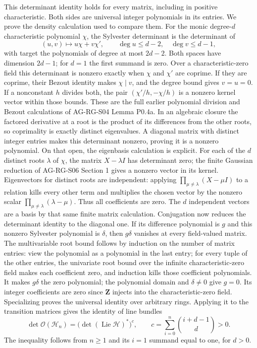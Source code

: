 \documentclass[11pt,a4paper,openany]{report}
\begin{document}
This determinant identity holds for every matrix, including in positive characteristic. Both sides are universal integer polynomials in its entries. We prove the density calculation used to compare them. For the monic degree-\(d\) characteristic polynomial \(\chi\), the Sylvester determinant is the determinant of \[
 (u,v)\longmapsto u\chi+v\chi',
 \qquad \deg u\leq d-2,\quad\deg v\leq d-1,
\] with target the polynomials of degree at most \(2d-2\). Both spaces have dimension \(2d-1\); for \(d=1\) the first summand is zero. Over a characteristic-zero field this determinant is nonzero exactly when \(\chi\) and \(\chi'\) are coprime. If they are coprime, their Bezout identity makes \(\chi\mid v\), and the degree bound gives \(v=u=0\). If a nonconstant \(h\) divides both, the pair \((\chi'/h,-\chi/h)\) is a nonzero kernel vector within those bounds. These are the full earlier polynomial division and Bezout calculations of AG-RG-S04 Lemma P0.4a. In an algebraic closure the factored derivative at a root is the product of its differences from the other roots, so coprimality is exactly distinct eigenvalues. A diagonal matrix with distinct integer entries makes this determinant nonzero, proving it is a nonzero polynomial. On that open, the eigenbasis calculation is explicit. For each of the \(d\) distinct roots \(\lambda\) of \(\chi\), the matrix \(X-\lambda I\) has determinant zero; the finite Gaussian reduction of AG-RG-S06 Section 1 gives a nonzero vector in its kernel. Eigenvectors for distinct roots are independent: applying \(\prod_{\mu\ne\lambda}(X-\mu I)\) to a relation kills every other term and multiplies the chosen vector by the nonzero scalar \(\prod_{\mu\ne\lambda}(\lambda-\mu)\). Thus all coefficients are zero. The \(d\) independent vectors are a basis by that same finite matrix calculation. Conjugation now reduces the determinant identity to the diagonal one. If its difference polynomial is \(g\) and this nonzero Sylvester polynomial is \(\delta\), then \(g\delta\) vanishes at every field-valued matrix. The multivariable root bound follows by induction on the number of matrix entries: view the polynomial as a polynomial in the last entry; for every tuple of the other entries, the univariate root bound over the infinite characteristic-zero field makes each coefficient zero, and induction kills those coefficient polynomials. It makes \(g\delta\) the zero polynomial; the polynomial domain and \(\delta\ne0\) give \(g=0\). Its integer coefficients are zero since \(\mathbf Z\) injects into the characteristic-zero field. Specializing proves the universal identity over arbitrary rings. Applying it to the transition matrices gives the identity of line bundles \[
 \det\mathcal O(\mathcal H_n)
   =\bigl(\det(\operatorname{Lie}\mathcal H)^*\bigr)^c,
 \qquad c=\sum_{i=0}^n\binom{i+d-1}{d}>0.
\] The inequality follows from \(n\geq1\) and its \(i=1\) summand equal to one, for \(d>0\).
\end{document}
